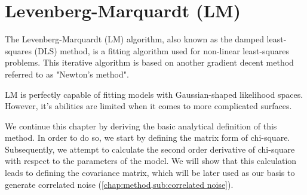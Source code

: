 \documentclass[12pt, TexShade, letterpaper]{report}
\begin{document}
\section{Levenberg-Marquardt (LM)}
\label{chap:method,sub:LM}
The Levenberg-Marquardt (LM) algorithm, also known as the damped least-squares (DLS) method, is a fitting algorithm used for non-linear least-squares problems. This iterative algorithm is based on another gradient decent method referred to as "Newton's method".\par
LM is perfectly capable of fitting models with Gaussian-shaped likelihood spaces. However, it's abilities are limited when it comes to more complicated surfaces.\par
We continue this chapter by deriving the basic analytical definition of this method. In order to do so, we start by defining the matrix form of chi-square. Subsequently, we attempt to calculate the second order derivative of chi-square with respect to the parameters of the model. We will show that this calculation leads to defining the covariance matrix, which will be later used as our basis to generate correlated noise (\ref{chap:method,sub:correlated noise}).\par
\end{document}
